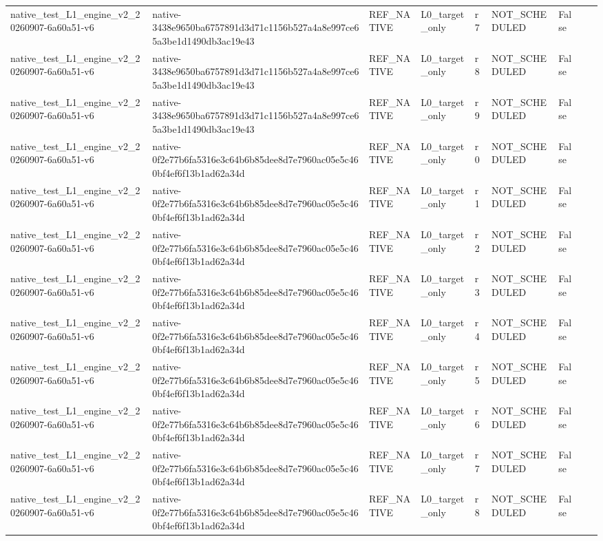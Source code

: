 \begin{tabular}{lllllllll}
native\_test\_L1\_engine\_v2\_20260907-6a60a51-v6 & native-3438e9650ba6757891d3d71c1156b527a4a8e997ce65a3be1d1490db3ac19e43 & REF\_NATIVE & L0\_target\_only & r7 & NOT\_SCHEDULED & False &  &  \\
native\_test\_L1\_engine\_v2\_20260907-6a60a51-v6 & native-3438e9650ba6757891d3d71c1156b527a4a8e997ce65a3be1d1490db3ac19e43 & REF\_NATIVE & L0\_target\_only & r8 & NOT\_SCHEDULED & False &  &  \\
native\_test\_L1\_engine\_v2\_20260907-6a60a51-v6 & native-3438e9650ba6757891d3d71c1156b527a4a8e997ce65a3be1d1490db3ac19e43 & REF\_NATIVE & L0\_target\_only & r9 & NOT\_SCHEDULED & False &  &  \\
native\_test\_L1\_engine\_v2\_20260907-6a60a51-v6 & native-0f2e77b6fa5316e3c64b6b85dee8d7e7960ac05e5c460bf4ef6f13b1ad62a34d & REF\_NATIVE & L0\_target\_only & r0 & NOT\_SCHEDULED & False &  &  \\
native\_test\_L1\_engine\_v2\_20260907-6a60a51-v6 & native-0f2e77b6fa5316e3c64b6b85dee8d7e7960ac05e5c460bf4ef6f13b1ad62a34d & REF\_NATIVE & L0\_target\_only & r1 & NOT\_SCHEDULED & False &  &  \\
native\_test\_L1\_engine\_v2\_20260907-6a60a51-v6 & native-0f2e77b6fa5316e3c64b6b85dee8d7e7960ac05e5c460bf4ef6f13b1ad62a34d & REF\_NATIVE & L0\_target\_only & r2 & NOT\_SCHEDULED & False &  &  \\
native\_test\_L1\_engine\_v2\_20260907-6a60a51-v6 & native-0f2e77b6fa5316e3c64b6b85dee8d7e7960ac05e5c460bf4ef6f13b1ad62a34d & REF\_NATIVE & L0\_target\_only & r3 & NOT\_SCHEDULED & False &  &  \\
native\_test\_L1\_engine\_v2\_20260907-6a60a51-v6 & native-0f2e77b6fa5316e3c64b6b85dee8d7e7960ac05e5c460bf4ef6f13b1ad62a34d & REF\_NATIVE & L0\_target\_only & r4 & NOT\_SCHEDULED & False &  &  \\
native\_test\_L1\_engine\_v2\_20260907-6a60a51-v6 & native-0f2e77b6fa5316e3c64b6b85dee8d7e7960ac05e5c460bf4ef6f13b1ad62a34d & REF\_NATIVE & L0\_target\_only & r5 & NOT\_SCHEDULED & False &  &  \\
native\_test\_L1\_engine\_v2\_20260907-6a60a51-v6 & native-0f2e77b6fa5316e3c64b6b85dee8d7e7960ac05e5c460bf4ef6f13b1ad62a34d & REF\_NATIVE & L0\_target\_only & r6 & NOT\_SCHEDULED & False &  &  \\
native\_test\_L1\_engine\_v2\_20260907-6a60a51-v6 & native-0f2e77b6fa5316e3c64b6b85dee8d7e7960ac05e5c460bf4ef6f13b1ad62a34d & REF\_NATIVE & L0\_target\_only & r7 & NOT\_SCHEDULED & False &  &  \\
native\_test\_L1\_engine\_v2\_20260907-6a60a51-v6 & native-0f2e77b6fa5316e3c64b6b85dee8d7e7960ac05e5c460bf4ef6f13b1ad62a34d & REF\_NATIVE & L0\_target\_only & r8 & NOT\_SCHEDULED & False &  &  \\

\end{tabular}
